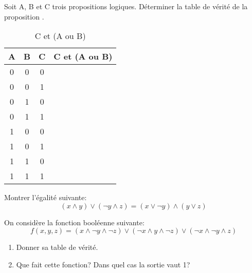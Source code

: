 \documentclass[a4paper,11pt]{article}
\begin{document}
\begin{exo}
Soit A, B et C trois propositions logiques. Déterminer la table de vérité de la proposition .
\begin{table}[!h]
\begin{center}
\begin{tabular}{|*4{c|}}
\hline 
A & B & C & C et (A ou B) \\ 
\hline 
0 & 0 & 0 &  \\ 
\hline 
0 & 0 & 1 & \\ 
\hline 
0 & 1 & 0 & \\
\hline 
0 & 1 & 1 & \\
\hline 
1 & 0 & 0 &  \\ 
\hline 
1 & 0 & 1 & \\ 
\hline 
1 & 1 & 0 & \\
\hline 
1 & 1 & 1 & \\
\hline 
\end{tabular}
\caption{\label{ex3}C et (A ou B)}
\end{center}
\end{table} 
\end{exo}
\begin{exo}
Montrer l'égalité suivante:
$$(x\land y)\lor (\lnot y \land z)=(x \lor \lnot y)\land (y \lor z)$$
\end{exo}
\begin{exo}
On considère la fonction booléenne suivante:
$$f(x,y,z)=(x\land \lnot y \land \lnot z)\lor (\lnot x \land y \land \lnot z) \lor (\lnot x \land \lnot y \land z)$$
\begin{enumerate}
\item Donner sa table de vérité.
\item Que fait cette fonction? Dans quel cas la sortie vaut 1?
\end{enumerate}
\end{exo}
\end{document}
